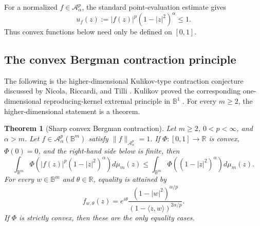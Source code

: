 \documentclass[11pt,reqno]{amsart}
\numberwithin{equation}{section}
\newtheorem{theorem}{Theorem}[section]
\theoremstyle{definition}
\theoremstyle{remark}
\begin{document}
For a normalized $f\in\mathcal A^p_\alpha$, the standard point-evaluation
estimate \cite[(1.1)]{LiSu2025} gives
\[
 u_f(z):=|f(z)|^p(1-|z|^2)^\alpha\le1.
\]
Thus convex functions below need only be defined on $[0,1]$.

\subsection{The convex Bergman contraction principle}

The following is the higher-dimensional Kulikov-type contraction conjecture
discussed by Nicola, Riccardi, and Tilli
\cite[Section~5]{NicolaRiccardiTilli2025}.  Kulikov proved the corresponding
one-dimensional reproducing-kernel extremal principle in $\mathbb B^1$
\cite{Kulikov2022}.  For every \(m\ge2\), the higher-dimensional
statement is a theorem.

\begin{theorem}[Sharp convex Bergman contraction]
\label{thm:convex-Bergman-contraction}
Let $m\ge2$, $0<p<\infty$, and $\alpha>m$.  Let
$f\in\mathcal A^p_\alpha(\mathbb B^m)$ satisfy
$\|f\|_{\mathcal A^p_\alpha}=1$.  If
$\Phi:[0,1]\to\mathbb R$ is convex, $\Phi(0)=0$, and the right-hand side
below is finite, then
\begin{equation}
 \int_{\mathbb B^m}
 \Phi\!\left(|f(z)|^p(1-|z|^2)^\alpha\right)d\mu_m(z)
 \le
 \int_{\mathbb B^m}
 \Phi\!\left((1-|z|^2)^\alpha\right)d\mu_m(z).
 \label{eq:convex-Bergman-contraction}
\end{equation}
For every $w\in\mathbb B^m$ and $\theta\in\mathbb R$, equality is attained
by
\begin{equation}
 f_{w,\theta}(z)
 =e^{i\theta}
 \frac{(1-|w|^2)^{\alpha/p}}{(1-\langle z,w\rangle)^{2\alpha/p}}.
 \label{eq:Bergman-extremizer}
\end{equation}
If $\Phi$ is strictly convex, then these are the only equality cases.
\end{theorem}
\end{document}
